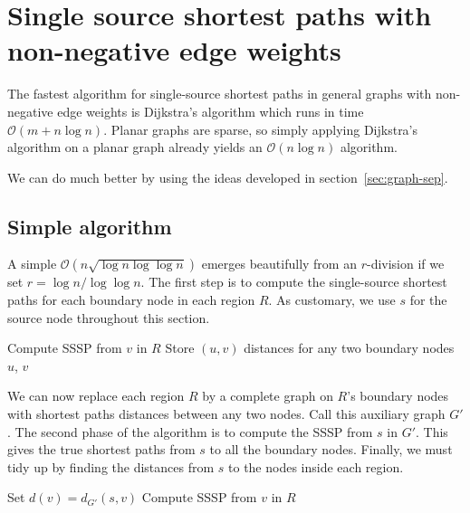 \documentclass[11pt]{article}
\begin{document}
\section{Single source shortest paths with non-negative edge weights}
\label{sec:nonn-edge-weights}

The fastest algorithm for single-source shortest paths in general graphs with non-negative edge weights is Dijkstra's algorithm which runs in time $\mathcal{O}(m + n\log n)$. Planar graphs are sparse, so simply applying Dijkstra's algorithm on a planar graph already yields an $\mathcal{O}(n \log n)$ algorithm.

We can do much better by using the ideas developed in section~\ref{sec:graph-sep}.

\subsection{Simple algorithm}
\label{sec:simple-algorithm}

A simple $\mathcal{O}(n\sqrt{\log n \log \log n})$ emerges beautifully from an $r$-division if we set $r = \log n/\log \log n$. The first step is to compute the single-source shortest paths for each boundary node in each region $R$. As customary, we use $s$ for the source node throughout this section.


\begin{algorithm}[!htb]
  \label{alg:sssp-region}
  \begin{algorithmic}
        \State Compute SSSP from $v$ in $R$
        \State Store $(u,v)$ distances for any two boundary nodes $u$, $v$
      \EndFor
    \EndFor
  \end{algorithmic}
\end{algorithm}

 We can now replace each region $R$ by a complete graph on $R$'s boundary nodes with shortest paths distances between any two nodes. Call this auxiliary graph $G'$. The second phase of the algorithm is to compute the SSSP from $s$ in $G'$. This gives the true shortest paths from $s$ to all the boundary nodes. Finally, we must tidy up by finding the distances from $s$ to the nodes inside each region.

\begin{algorithm}[!htb]
  \label{alg:sssp-full}
  \begin{algorithmic}
        \State Set $d(v) = d_{G'}(s,v)$
        \State Compute SSSP from $v$ in $R$
      \EndFor
    \EndFor
  \end{algorithmic}
\end{algorithm}
\end{document}
